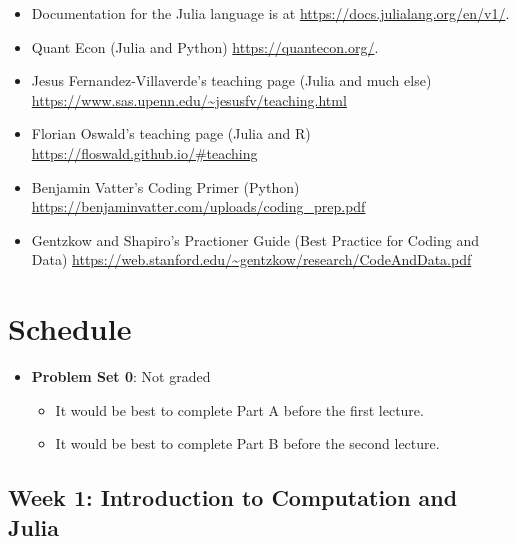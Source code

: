 \documentclass[
]{book}
\providecommand{\tightlist}{%
  \setlength{\itemsep}{0pt}\setlength{\parskip}{0pt}}
\begin{document}
\begin{itemize}
\tightlist
\item
  Documentation for the Julia language is at \url{https://docs.julialang.org/en/v1/}.
\item
  Quant Econ (Julia and Python) \url{https://quantecon.org/}.
\item
  Jesus Fernandez-Villaverde's teaching page (Julia and much else) \url{https://www.sas.upenn.edu/~jesusfv/teaching.html}
\item
  Florian Oswald's teaching page (Julia and R) \url{https://floswald.github.io/\#teaching}
\item
  Benjamin Vatter's Coding Primer (Python) \url{https://benjaminvatter.com/uploads/coding_prep.pdf}
\item
  Gentzkow and Shapiro's Practioner Guide (Best Practice for Coding and Data) \url{https://web.stanford.edu/~gentzkow/research/CodeAndData.pdf}
\end{itemize}

\hypertarget{schedule}{%
\section{Schedule}\label{schedule}}

\begin{itemize}
\tightlist
\item
  \textbf{Problem Set 0}: Not graded

  \begin{itemize}
  \tightlist
  \item
    It would be best to complete Part A before the first lecture.
  \item
    It would be best to complete Part B before the second lecture.
  \end{itemize}
\end{itemize}

\hypertarget{week-1-introduction-to-computation-and-julia}{%
\subsection{Week 1: Introduction to Computation and Julia}\label{week-1-introduction-to-computation-and-julia}}
\end{document}
